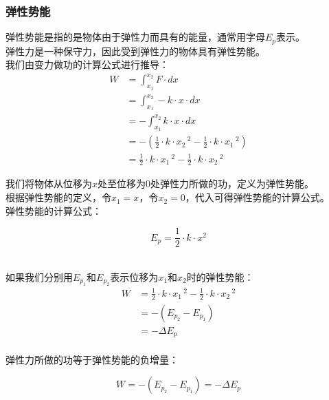 \documentclass[UTF8]{ctexart}
\begin{document}
\subsubsection{弹性势能}
    弹性势能是指的是物体由于弹性力而具有的能量，通常用字母$E_p$表示。\\[2mm]
    弹性力是一种保守力，因此受到弹性力的物体具有弹性势能。\\[4mm]
    我们由变力做功的计算公式进行推导：\vspace{5pt}
    \setcounter{equation}{0}
    \begin{align}
        W
        &=\int_{x_1}^{x_2} F\cdot dx\\[3mm]
        &=\int_{x_1}^{x_2} -k\cdot x\cdot dx\\[3mm]
        &=-\int_{x_1}^{x_2} k\cdot x\cdot dx\\[3mm]
        &=-\left(\frac{1}{2}\cdot k\cdot x_2\,^2-\frac{1}{2}\cdot k\cdot x_1\,^2\right)\\[3mm]
        &=\frac{1}{2}\cdot k\cdot x_1\,^2-\frac{1}{2}\cdot k\cdot x_2\,^2
    \end{align}

\newpage

    我们将物体从位移为$x$处至位移为$0$处弹性力所做的功，定义为弹性势能。\\[3mm]
    根据弹性势能的定义，令$x_1=x$，令$x_2=0$，代入可得弹性势能的计算公式。\\[5mm]
    弹性势能的计算公式：
    \begin{large}
        \begin{equation*}
            E_p=\frac{1}{2}\cdot k\cdot x^2
        \end{equation*}
    \end{large}\\
    如果我们分别用$E_{p_1}$和$E_{p_2}$表示位移为$x_1$和$x_2$时的弹性势能：\vspace{5pt}
    \begin{align}
        W
        &=\frac{1}{2}\cdot k\cdot x_1\,^2-\frac{1}{2}\cdot k\cdot x_2\,^2\\[3mm]
        &=-(E_{p_2}-E_{p_1})\\[3mm]
        &=-\Delta E_p
    \end{align}\\
    弹性力所做的功等于弹性势能的负增量：
    \begin{large}
        \begin{equation*}
            W=-(E_{p_2}-E_{p_1})=-\Delta E_p
        \end{equation*}
    \end{large}
\end{document}
